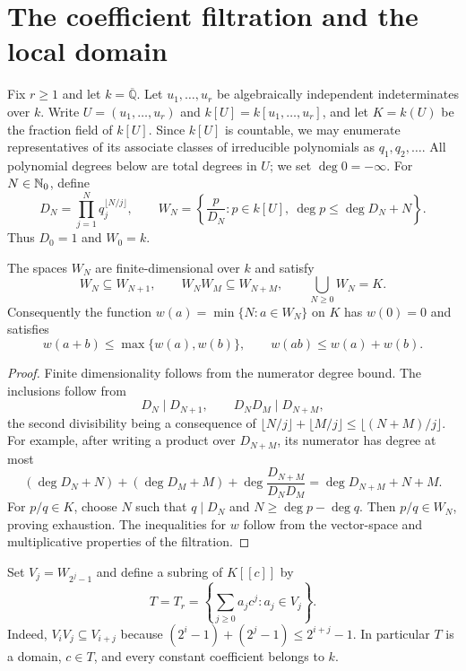 \section{The coefficient filtration and the local domain}
\label{sec:filtration}

Fix $r\ge1$ and let $k=\overline{\mathbb Q}$.
Let $u_1,\ldots,u_r$ be algebraically independent indeterminates
over $k$. Write $U=(u_1,\ldots,u_r)$ and
$k[U]=k[u_1,\ldots,u_r]$, and let $K=k(U)$ be the fraction field
of $k[U]$. Since $k[U]$ is countable,
we may enumerate representatives of its associate classes of
irreducible polynomials as $q_1,q_2,\ldots$. All polynomial degrees
below are total degrees in $U$; we set $\deg0=-\infty$.
For $N\in\mathbb N_0$, define
\begin{equation}\label{eq:windows}
 D_N=\prod_{j=1}^{N}q_j^{\lfloor N/j\rfloor},\qquad
 W_N=\left\{\frac{p}{D_N}:p\in k[U],\
             \deg p\le\deg D_N+N\right\}.
\end{equation}
Thus $D_0=1$ and $W_0=k$.

\begin{lemma}\label{lem:filtration}
The spaces $W_N$ are finite-dimensional over $k$ and satisfy
\begin{equation}\label{eq:filtration}
 W_N\subseteq W_{N+1},\qquad W_NW_M\subseteq W_{N+M},\qquad
 \bigcup_{N\ge0}W_N=K.
\end{equation}
Consequently the function $w(a)=\min\{N:a\in W_N\}$ on $K$
has $w(0)=0$ and satisfies
\begin{equation}\label{eq:weight}
 w(a+b)\le\max\{w(a),w(b)\},\qquad
 w(ab)\le w(a)+w(b).
\end{equation}
\end{lemma}

\begin{proof}
Finite dimensionality follows from the numerator degree bound.
The inclusions follow from
\[
 D_N\mid D_{N+1},\qquad D_ND_M\mid D_{N+M},
\]
the second divisibility being a consequence of
$\lfloor N/j\rfloor+\lfloor M/j\rfloor\le\lfloor(N+M)/j\rfloor$.
For example, after writing a product over $D_{N+M}$, its numerator
has degree at most
\[
 (\deg D_N+N)+(\deg D_M+M)
       +\deg\frac{D_{N+M}}{D_ND_M}
 =\deg D_{N+M}+N+M.
\]
For $p/q\in K$, choose $N$ such that $q\mid D_N$ and
$N\ge\deg p-\deg q$. Then $p/q\in W_N$, proving exhaustion.
The inequalities for $w$ follow from the vector-space and
multiplicative properties of the filtration.
\end{proof}

Set $V_j=W_{2^j-1}$ and define a subring of $K[[c]]$ by
\begin{equation}\label{eq:T}
 T=T_r=\left\{\sum_{j\ge0}a_jc^j:a_j\in V_j\right\}.
\end{equation}
Indeed, $V_iV_j\subseteq V_{i+j}$ because
$(2^i-1)+(2^j-1)\le2^{i+j}-1$. In particular $T$ is a domain,
$c\in T$, and every constant coefficient belongs to $k$.

